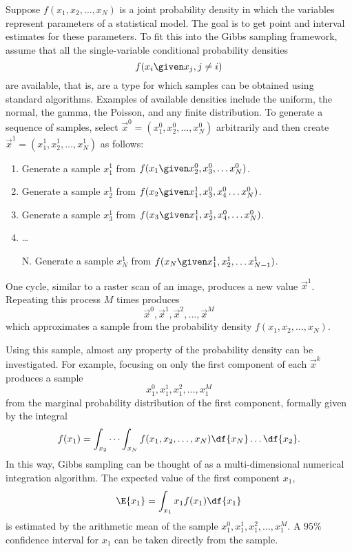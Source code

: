 \documentclass[12pt]{article}
\begin{document}
Suppose \( f(x_1, x_2, \dots, x_N) \) is a joint probability density in
which the variables represent parameters of a statistical model.  The
goal is to get point and interval estimates for these parameters. To fit
this into the Gibbs sampling framework, assume that all the
single-variable conditional probability densities
\[
    f(x_i \given x_j, j \ne i)
\] are available, that is, are a type for which samples can be obtained
using standard algorithms.  Examples of available densities include
the uniform, the normal, the gamma, the Poisson, and any finite
distribution.  To generate a sequence of samples, select \(
\overrightarrow{x}^0 = (x_1^0, x_2^0, \dots, x_N^0) \) arbitrarily and
then create \( \overrightarrow{x}^1 = (x_1^1, x_2^1, \dots, x_N^1) \) as
follows:
\begin{enumerate}
    \item
        Generate a sample \( x_1^1 \) from \( f(x_1 \given x_2^0, x_3^0,
        \dots x_N^0) \).
    \item
        Generate a sample \( x_2^1 \) from \( f(x_2 \given x_1^1, x_3^0,x_4^
        {0} \dots x_N^0) \).
    \item
        Generate a sample \( x_3^1 \) from \( f(x_3 \given x_1^1, x_2^1,
        x_4^0, \dots x_N^0) \).
    \item
        \dots
    \item[N.]
        Generate a sample \( x_N^1 \) from \( f(x_N \given x_1^1, x_2^1,
        \dots x_{N-1}^1) \).
\end{enumerate}
One cycle, similar to a raster scan of an image, produces a new value \(
\overrightarrow{x}^1 \).  Repeating this process \( M \) times produces
\[
    \overrightarrow{x}^0, \overrightarrow{x}^1, \overrightarrow{x}^2,
    \dots, \overrightarrow{x}^M
\] which approximates a sample from the probability density \(
f(x_1, x_2, \dots, x_N) \).

Using this sample, almost any property of the probability density
can be investigated.  For example, focusing on only the first component
of each \( \overrightarrow{x}^k \) produces a sample
\[
    x_1^0, x_1^1, x_1^2,\dots, x_1^M
\] from the marginal probability distribution of the first component,
formally given by the integral
\[
    f(x_1) = \int_{x_2}\cdots \int_{x_N} f(x_1, x_2, \dots, x_N) \df{x_N}
    \dots \df{x_2}.
\] In this way, Gibbs sampling can be thought of as a multi-dimensional
numerical integration algorithm.  The expected value of the first
component \( x_1 \),
\[
    \E{x_1} = \int_{x_1} x_1 f(x_1) \df{x_1}
\] is estimated by the arithmetic mean of the sample \( x_1^0, x_1^1, x_1^2,\dots,
x_1^M \).  A \( 95\% \) confidence interval for \( x_1 \) can be taken
directly from the sample.
\end{document}

